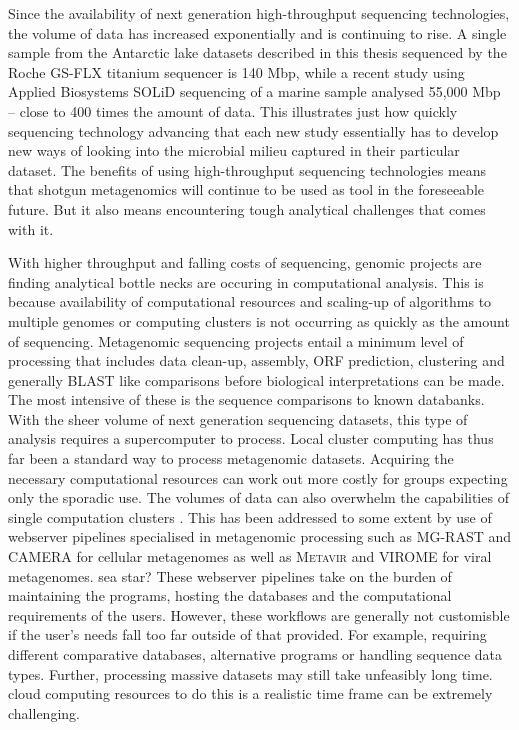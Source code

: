 Since the availability of next generation high-throughput sequencing technologies, the volume of data has increased exponentially and is continuing to rise.
A single sample from the Antarctic lake datasets described in this thesis sequenced by the Roche GS-FLX titanium sequencer is 140 Mbp, while a recent study using Applied Biosystems SOLiD sequencing of a marine sample \cite{Iverson2012} analysed 55,000 Mbp -- close to 400 times the amount of data.
This illustrates just how quickly sequencing technology advancing that each new study essentially has to develop new ways of looking into the microbial milieu captured in their particular dataset.
The benefits of using high-throughput sequencing technologies means that shotgun metagenomics will continue to be used as tool in the foreseeable future.
But it also means encountering tough analytical challenges that comes with it.

With higher throughput and falling costs of sequencing, genomic projects are finding analytical bottle necks are occuring in computational analysis.
This is because availability of computational resources and scaling-up of algorithms to multiple genomes or computing clusters is not occurring as quickly as the amount of sequencing.
Metagenomic sequencing projects entail a minimum level of processing that includes data clean-up, assembly, \ac{ORF} prediction, clustering and generally \ac{BLAST} like comparisons before biological interpretations can be made.
The most intensive of these is the sequence comparisons to known databanks.
With the sheer volume of next generation sequencing datasets, this type of analysis requires a supercomputer to process.
Local cluster computing has thus far been a standard way to process metagenomic datasets. 
Acquiring the necessary computational resources can work out more costly for groups expecting only the sporadic use.
The volumes of data can also overwhelm the capabilities of single computation clusters \cite{Iverson2012}.
This has been addressed to some extent by use of webserver pipelines specialised in metagenomic processing such as \ac{MG-RAST} \cite{Meyer2008} and \ac{CAMERA} \cite{Sun2011} for cellular metagenomes as well as \textsc{Metavir} \cite{Roux2011} and \textsc{VIROME} \cite{Wommack2012} for viral metagenomes. sea star?
These webserver pipelines take on the burden of maintaining the programs, hosting the databases and the computational requirements of the users.
However, these workflows are generally not customisble if the user's needs fall too far outside of that provided. 
For example, requiring different comparative databases, alternative programs or handling sequence data types.
Further, processing massive datasets may still take unfeasibly long time.
cloud computing resources \cite{}
to do this is a realistic time frame can be extremely challenging.

